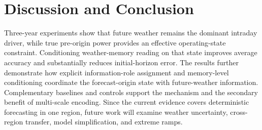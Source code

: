 \section{Discussion and Conclusion}

Three-year experiments show that future weather remains the dominant intraday driver, while true pre-origin power provides an effective operating-state constraint. Conditioning weather-memory reading on that state improves average accuracy and substantially reduces initial-horizon error. The results further demonstrate how explicit information-role assignment and memory-level conditioning coordinate the forecast-origin state with future-weather information. Complementary baselines and controls support the mechanism and the secondary benefit of multi-scale encoding. Since the current evidence covers deterministic forecasting in one region, future work will examine weather uncertainty, cross-region transfer, model simplification, and extreme ramps.
